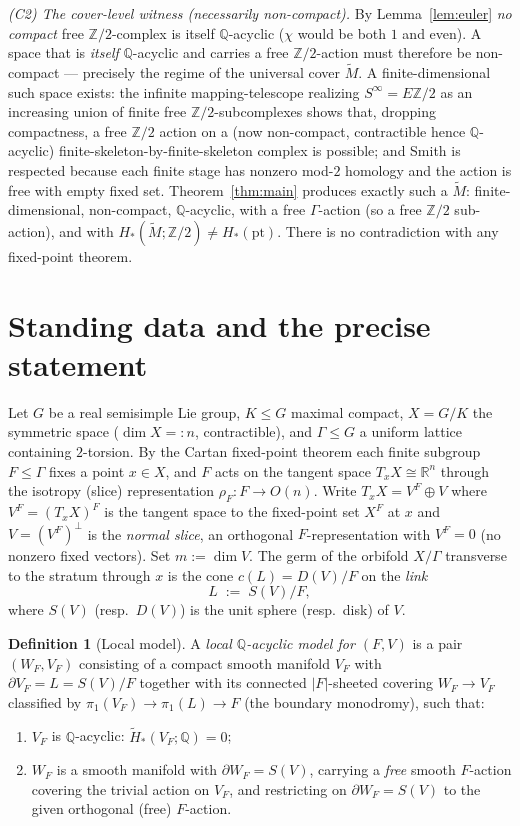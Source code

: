 \documentclass[12pt]{article}
\theoremstyle{definition}
\newtheorem{definition}[theorem]{Definition}
\begin{document}
\emph{(C2) The cover-level witness (necessarily non-compact).} By
Lemma~\ref{lem:euler} \emph{no compact} free $\mathbb{Z}/2$-complex is itself
$\mathbb{Q}$-acyclic ($\chi$ would be both $1$ and even). A space that is
\emph{itself} $\mathbb{Q}$-acyclic and carries a free $\mathbb{Z}/2$-action must
therefore be non-compact --- precisely the regime of the universal cover
$\widetilde M$. A finite-dimensional such space exists: the infinite
mapping-telescope realizing $S^\infty=E\mathbb{Z}/2$ as an increasing union of
finite free $\mathbb{Z}/2$-subcomplexes shows that, dropping compactness, a free
$\mathbb{Z}/2$ action on a (now non-compact, contractible hence
$\mathbb{Q}$-acyclic) finite-skeleton-by-finite-skeleton complex is possible;
and Smith is respected because each finite stage has nonzero mod-$2$ homology
and the action is free with empty fixed set. Theorem~\ref{thm:main} produces
exactly such a $\widetilde M$: finite-dimensional, non-compact,
$\mathbb{Q}$-acyclic, with a free $\Gamma$-action (so a free $\mathbb{Z}/2$
sub-action), and with $H_*(\widetilde M;\mathbb{Z}/2)\neq H_*(\mathrm{pt})$.
There is no contradiction with any fixed-point theorem.

\section{Standing data and the precise statement}\label{sec:setup}

Let $G$ be a real semisimple Lie group, $K\le G$ maximal compact,
$X=G/K$ the symmetric space ($\dim X=:n$, contractible), and $\Gamma\le G$ a
uniform lattice containing $2$-torsion. By the Cartan fixed-point theorem each
finite subgroup $F\le\Gamma$ fixes a point $x\in X$, and $F$ acts on the
tangent space $T_xX\cong\mathbb{R}^{n}$ through the isotropy (slice)
representation $\rho_F\colon F\to O(n)$. Write $T_xX=V^F\oplus V$ where
$V^F=(T_xX)^F$ is the tangent space to the fixed-point set $X^F$ at $x$ and
$V=(V^F)^\perp$ is the \emph{normal slice}, an orthogonal $F$-representation
with $V^F=0$ (no nonzero fixed vectors). Set $m:=\dim V$. The germ of the
orbifold $X/\Gamma$ transverse to the stratum through $x$ is the cone
$c(L)=D(V)/F$ on the \emph{link}
\[
   L \;:=\; S(V)/F,
\]
where $S(V)$ (resp.\ $D(V)$) is the unit sphere (resp.\ disk) of $V$.

\begin{definition}[Local model]\label{def:model}
A \emph{local $\mathbb{Q}$-acyclic model for $(F,V)$} is a pair $(W_F,V_F)$
consisting of a compact smooth manifold $V_F$ with $\partial V_F=L=S(V)/F$
together with its connected $|F|$-sheeted covering $W_F\to V_F$ classified by
$\pi_1(V_F)\to\pi_1(L)\to F$ (the boundary monodromy), such that:
\begin{enumerate}
\item[(M1)] $V_F$ is $\mathbb{Q}$-acyclic: $\widetilde H_*(V_F;\mathbb{Q})=0$;
\item[(M2)] $W_F$ is a smooth manifold with $\partial W_F=S(V)$, carrying a
\emph{free} smooth $F$-action covering the trivial action on $V_F$, and
restricting on $\partial W_F=S(V)$ to the given orthogonal (free) $F$-action.
\end{enumerate}
\end{definition}
\end{document}
